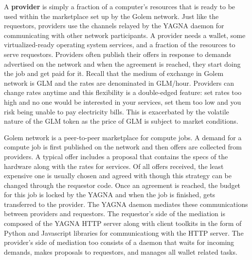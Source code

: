 \documentclass[a4paper, 10pt]{article}
\begin{document}
A \textbf{provider} is simply a fraction of a computer's resources that is ready to be used within the marketplace set up by the Golem network. Just like the requestors, providers use the channels relayed by the YAGNA daemon for communicating with other network participants. A provider needs a wallet, some virtualized-ready operating system services, and a fraction of the resources to serve requestors. Providers often publish their offers in response to demands advertised on the network and when the agreement is reached, they start doing the job and get paid for it. Recall that the medium of exchange in Golem network is GLM and the rates are denominated in GLM/hour. Providers can change rates anytime and this flexibility is a double-edged feature: set rates too high and no one would be interested in your services, set them too low and you risk being unable to pay electricity bills. This is exacerbated by the volatile nature of the GLM token as the price of GLM is subject to market conditions.
\par
Golem network is a peer-to-peer marketplace for compute jobs. A demand for a compute job is first published on the network and then offers are collected from providers. A typical offer includes a proposal that contains the specs of the hardware along with the rates for services. Of all offers received, the least expensive one is usually chosen and agreed with though this strategy can be changed through the requestor code. Once an agreement is reached, the budget for this job is locked by the YAGNA and when the job is finished, gets transferred to the provider. The YAGNA daemon mediates these communications between providers and requestors. The requestor's side of the mediation is composed of the YAGNA HTTP server along with client toolkits in the form of Python and Javascript libraries for communicationg with the HTTP server. The provider's side of mediation too consists of a daemon that waits for incoming demands, makes proposals to requestors, and manages all wallet related tasks.
\end{document}
